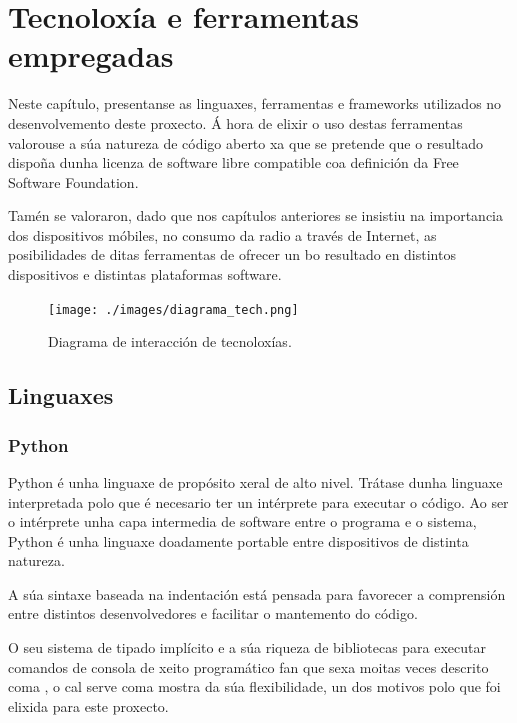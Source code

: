 \chapter[Tecnoloxía e ferramentas empregadas]{
  \label{chp:tecnologia}
  Tecnoloxía e ferramentas empregadas
}
\minitoc
\newpage

Neste capítulo, presentanse as linguaxes, ferramentas e frameworks utilizados no desenvolvemento deste proxecto. Á hora de elixir o uso destas ferramentas valorouse a súa natureza de código aberto xa que se pretende que o resultado dispoña dunha licenza de software libre compatible coa definición da Free Software Foundation. 

Tamén se valoraron, dado que nos capítulos anteriores se insistiu na importancia dos dispositivos móbiles, no consumo da radio a través de Internet, as posibilidades de ditas ferramentas de ofrecer un bo resultado en distintos dispositivos e distintas plataformas software. 


\begin{figure}[H]
	\centering
	\texttt{[image: ./images/diagrama\_tech.png]}
	\caption{Diagrama de interacción de tecnoloxías.}
	\label{fig:img_diagrama_tech}
\end{figure}


\section{Linguaxes}

\subsection{Python}
\label{python}
Python é unha linguaxe de propósito xeral de alto nivel. Trátase dunha linguaxe interpretada polo que é necesario 
ter un intérprete para executar o código. Ao ser o intérprete unha capa intermedia de software entre o programa
e o sistema, Python é unha linguaxe doadamente portable entre dispositivos de distinta natureza.

A súa sintaxe baseada na indentación está pensada para favorecer a comprensión entre distintos desenvolvedores e 
facilitar o mantemento do código. 

O seu sistema de tipado implícito e a súa riqueza de bibliotecas para executar comandos de consola de xeito programático
fan que sexa moitas veces descrito coma \cite{python1}, o cal serve coma 
mostra da súa flexibilidade, un dos motivos polo que foi elixida para este proxecto.

